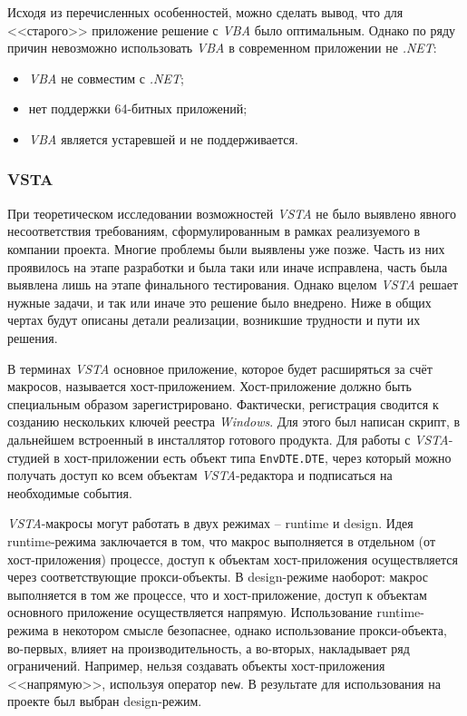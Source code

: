 Исходя из перечисленных особенностей, можно сделать вывод, что для <<старого>> приложение решение с {\it VBA} было оптимальным. Однако по ряду причин невозможно использовать {\it VBA} в современном приложении не {\it .NET}:

\begin{itemize}
   \item {\it VBA} не совместим с {\it .NET};
   \item нет поддержки 64-битных приложений;
   \item {\it VBA} является устаревшей и не поддерживается.
\end{itemize}


\subsubsection{VSTA}
\label{sec:use-itm-vsta}

При теоретическом исследовании возможностей {\it VSTA} не было выявлено явного несоответствия требованиям, сформулированным в рамках реализуемого в компании проекта. Многие проблемы были выявлены уже позже. Часть из них проявилось на этапе разработки и была таки или иначе исправлена, часть была выявлена лишь на этапе финального тестирования. Однако вцелом {\it VSTA} решает нужные задачи, и так или иначе это решение было внедрено. Ниже в общих чертах будут описаны детали реализации, возникшие трудности и пути их решения.

В терминах {\it VSTA} основное приложение, которое будет расширяться за счёт макросов, называется хост-приложением. Хост-приложение должно быть специальным образом зарегистрировано. Фактически, регистрация сводится к созданию нескольких ключей реестра {\it Windows}. Для этого был написан скрипт, в дальнейшем встроенный в инсталлятор готового продукта. Для работы с {\it VSTA}-студией в хост-приложении есть объект типа {\tt EnvDTE.DTE}, через который можно получать доступ ко всем объектам {\it VSTA}-редактора и подписаться на необходимые события.

{\it VSTA}-макросы могут работать в двух режимах – runtime и design. Идея runtime-режима заключается в том, что макрос выполняется в отдельном (от хост-приложения) процессе, доступ к объектам хост-приложения осуществляется через соответствующие прокси-объекты. В design-режиме наоборот: макрос выполняется в том же процессе, что и хост-приложение, доступ к объектам основного приложение осуществляется напрямую. Использование runtime-режима в некотором смысле безопаснее, однако использование прокси-объекта, во-первых, влияет на производительность, а во-вторых, накладывает ряд ограничений. Например, нельзя создавать объекты хост-приложения <<напрямую>>, используя оператор {\tt new}. В результате для использования на проекте был выбран design-режим.

